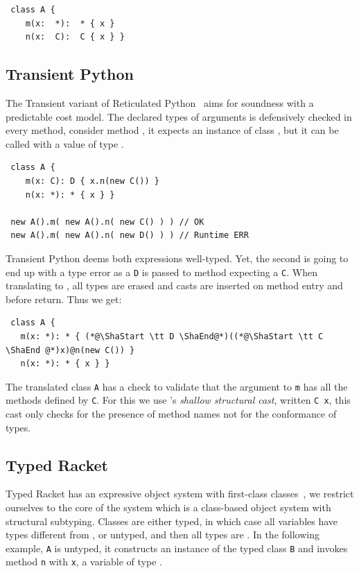 \documentclass[a4paper,USenglish]{tex/lipics-v2016}
\newcommand{\code}[1]{{\tt #1}\xspace}
\begin{document}
\begin{lstlisting}
 class A {
    m(x:  *):  * { x }
    n(x:  C):  C { x } }
\end{lstlisting}

\subsection{Transient Python}

The Transient variant of Reticulated Python~\cite{siek14} aims for soundness
with a predictable cost model. The declared types of arguments is
defensively checked in every method, consider method \m, it expects an
instance of class \C, but it can be called with a value of type \any.

\begin{lstlisting}
 class A {
    m(x: C): D { x.n(new C()) }
    n(x: *): * { x } }

 new A().m( new A().n( new C() ) ) // OK
 new A().m( new A().n( new D() ) ) // Runtime ERR
\end{lstlisting}

\noindent
Transient Python deems both expressions well-typed. Yet, the second is going
to end up with a type error as a \code D is passed to method expecting a
\code C.  When translating to \kafka, all types are erased and casts are
inserted on method entry and before return. Thus we get:

\begin{lstlisting}
 class A {
   m(x: *): * { (*@\ShaStart \tt D \ShaEnd@*)((*@\ShaStart \tt C \ShaEnd @*)x)@n(new C()) }
   n(x: *): * { x } }
\end{lstlisting}

\noindent The translated class \code A has a check to validate that the
argument to \code m has all the methods defined by \code C. For this we use
\kafka's \emph{shallow structural cast}, written {\ShaStart \tt C \ShaEnd
  x}, this cast only checks for the presence of method names not for the
conformance of types.


\subsection{Typed Racket}

Typed Racket has an expressive object system with first-class
classes~\cite{Takikawa:2012}, we restrict ourselves to the core of the
system which is a class-based object system with structural subtyping.
Classes are either typed, in which case all variables have types different
from \any, or untyped, and then all types are \any.  In the following
example, \code A is untyped, it constructs an instance of the typed class
\code{B} and invokes method \code{n} with \code x, a variable of type \any.
\end{document}
